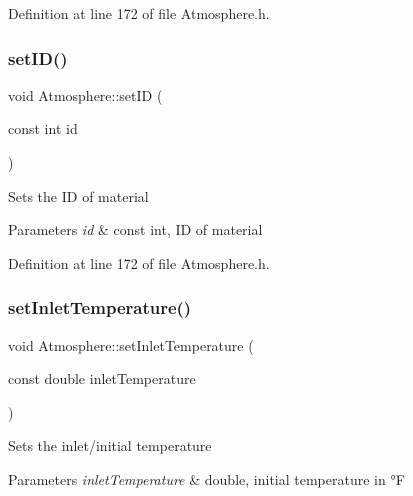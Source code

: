 Definition at line 172 of file Atmosphere.\+h.

\mbox{\label{class_atmosphere_a4698bf2580f7c24c8e0617d6455bfcac}} 
\subsubsection{\texorpdfstring{set\+I\+D()}{setID()}\hspace{0.1cm}{\footnotesize\ttfamily [3/3]}}
{\footnotesize\ttfamily void Atmosphere\+::set\+ID (\begin{DoxyParamCaption}\item[{const int}]{id }\end{DoxyParamCaption})\hspace{0.3cm}{\ttfamily [inline]}}

Sets the ID of material 
\begin{DoxyParams}{Parameters}
{\em id} & const int, ID of material \\
\hline
\end{DoxyParams}


Definition at line 172 of file Atmosphere.\+h.

\mbox{\label{class_atmosphere_a592bf7f82ea518fbd9da86d8f10cbc5c}} 
\subsubsection{\texorpdfstring{set\+Inlet\+Temperature()}{setInletTemperature()}\hspace{0.1cm}{\footnotesize\ttfamily [1/3]}}
{\footnotesize\ttfamily void Atmosphere\+::set\+Inlet\+Temperature (\begin{DoxyParamCaption}\item[{const double}]{inlet\+Temperature }\end{DoxyParamCaption})\hspace{0.3cm}{\ttfamily [inline]}}

Sets the inlet/initial temperature 
\begin{DoxyParams}{Parameters}
{\em inlet\+Temperature} & double, initial temperature in °F \\
\hline
\end{DoxyParams}


